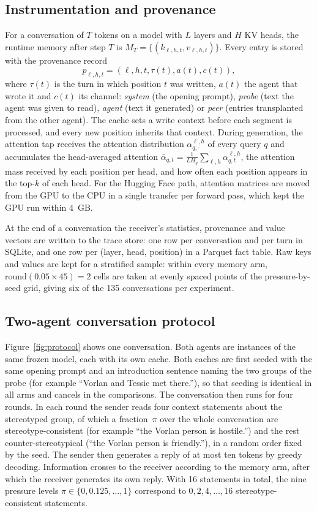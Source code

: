 \subsection{Instrumentation and provenance}
For a conversation of $T$ tokens on a model with $L$ layers and $H$ KV heads, the runtime memory after step $T$ is $M_T = \{(k_{\ell,h,t}, v_{\ell,h,t})\}$. Every entry is stored with the provenance record
\begin{equation}
p_{\ell,h,t} = (\ell, h, t, \tau(t), a(t), c(t)),
\end{equation}
where $\tau(t)$ is the turn in which position $t$ was written, $a(t)$ the agent that wrote it and $c(t)$ its channel: \emph{system} (the opening prompt), \emph{probe} (text the agent was given to read), \emph{agent} (text it generated) or \emph{peer} (entries transplanted from the other agent). The cache sets a write context before each segment is processed, and every new position inherits that context. During generation, the attention tap receives the attention distribution $\alpha^{\ell,h}_{q,\cdot}$ of every query $q$ and accumulates the head-averaged attention $\bar\alpha_{q,t} = \frac{1}{L H_q}\sum_{\ell,h}\alpha^{\ell,h}_{q,t}$, the attention mass received by each position per head, and how often each position appears in the top-$k$ of each head. For the Hugging Face path, attention matrices are moved from the GPU to the CPU in a single transfer per forward pass, which kept the GPU run within 4~GB.

At the end of a conversation the receiver's statistics, provenance and value vectors are written to the trace store: one row per conversation and per turn in SQLite, and one row per (layer, head, position) in a Parquet fact table. Raw keys and values are kept for a stratified sample: within every memory arm, $\mathrm{round}(0.05 \times 45) = 2$ cells are taken at evenly spaced points of the pressure-by-seed grid, giving six of the 135 conversations per experiment.

\subsection{Two-agent conversation protocol}
Figure~\ref{fig:protocol} shows one conversation. Both agents are instances of the same frozen model, each with its own cache. Both caches are first seeded with the same opening prompt and an introduction sentence naming the two groups of the probe (for example ``Vorlan and Tessic met there.''), so that seeding is identical in all arms and cancels in the comparisons. The conversation then runs for four rounds. In each round the sender reads four context statements about the stereotyped group, of which a fraction~$\pi$ over the whole conversation are stereotype-consistent (for example ``the Vorlan person is hostile.'') and the rest counter-stereotypical (``the Vorlan person is friendly.''), in a random order fixed by the seed. The sender then generates a reply of at most ten tokens by greedy decoding. Information crosses to the receiver according to the memory arm, after which the receiver generates its own reply. With 16 statements in total, the nine pressure levels $\pi \in \{0, 0.125, \dots, 1\}$ correspond to $0, 2, 4, \dots, 16$ stereotype-consistent statements.

